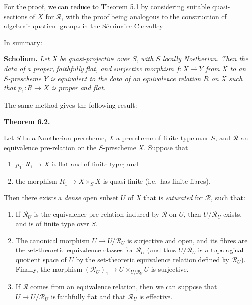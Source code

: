 \documentclass{article}
\providecommand{\tightlist}{%
  \setlength{\itemsep}{0pt}\setlength{\parskip}{0pt}}
\newenvironment{itenv}[1]
  {\phantomsection\par\smallskip\noindent\textbf{#1.}\itshape}
  {\par\smallskip}
\theoremstyle{definition}
\theoremstyle{definition}
\theoremstyle{definition}
\theoremstyle{definition}
\theoremstyle{remark}
\begin{document}
For the proof, we can reduce to \protect\hyperlink{fga-3-iii-theorem-5.1}{Theorem 5.1} by considering suitable quasi-sections of \(X\) for \({\mathcal{R}}\), with the proof being analogous to the construction of algebraic quotient groups in the Séminaire Chevalley.

In summary:

\begin{itenv}{Scholium}
Let \(X\) be quasi-projective over \(S\), with \(S\) locally Noetherian.
Then the data of a proper, faithfully flat, and surjective morphism \(f\colon X\to Y\) from \(X\) to an \(S\)-prescheme \(Y\) is equivalent to the data of an equivalence relation \(R\) on \(X\) such that \(p_1\colon R\to X\) is proper and flat.

\end{itenv}

The same method gives the following result:

\hypertarget{fga-3-iii-theorem-6.2}{}
\begin{itenv}{Theorem 6.2}

Let \(S\) be a Noetherian prescheme, \(X\) a prescheme of finite type over \(S\), and \({\mathcal{R}}\) an equivalence pre-relation on the \(S\)-prescheme \(X\).
Suppose that

\begin{enumerate}
\def\labelenumi{\alph{enumi}.}
\tightlist
\item
  \(p_1\colon R_1\to X\) is flat and of finite type; and
\item
  the morphism \(R_1\to X\times_S X\) is quasi-finite (i.e.~has finite fibres).
\end{enumerate}

Then there exists a \emph{dense} open subset \(U\) of \(X\) that is \emph{saturated} for \({\mathcal{R}}\), such that:

\begin{enumerate}
\def\labelenumi{\roman{enumi}.}
\item
  If \({\mathcal{R}}_U\) is the equivalence pre-relation induced by \({\mathcal{R}}\) on \(U\), then \(U/{\mathcal{R}}_U\) exists, and is of finite type over \(S\).
\item
  The canonical morphism \(U\to U/{\mathcal{R}}_U\) is surjective and open, and its fibres are the set-theoretic equivalence classes for \({\mathcal{R}}_U\) (and thus \(U/{\mathcal{R}}_U\) is a topological quotient space of \(U\) by the set-theoretic equivalence relation defined by \({\mathcal{R}}_U\)).
  Finally, the morphism \(({\mathcal{R}}_U)_1\to U\times_{U/{\mathcal{R}}_U}U\) is surjective.
\item
  If \({\mathcal{R}}\) comes from an equivalence relation, then we can suppose that \(U\to U/{\mathcal{R}}_U\) is faithfully flat and that \({\mathcal{R}}_U\) is effective.
\end{enumerate}

\end{itenv}
\end{document}

